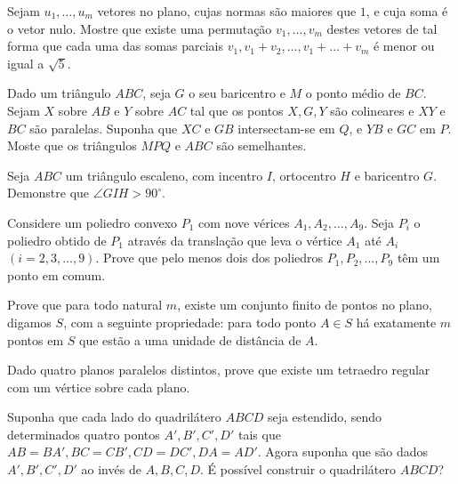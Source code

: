 \begin{questao}
  Sejam $u_1,\ldots,u_m$ vetores no plano, cujas normas
  são maiores que $1$, e cuja soma é o vetor nulo. Mostre que existe
  uma permutação $v_1,\ldots,v_m$ destes vetores de tal forma que
  cada uma das somas parciais $v_1, v_1+v_2,\ldots,v_1+\ldots+v_m$ é
  menor ou igual a $\sqrt{5}$.
\end{questao}

\begin{questao}
  Dado um triângulo $ABC$, seja $G$ o seu baricentro e
  $M$ o ponto médio de $BC$. Sejam $X$ sobre $AB$ e $Y$
  sobre $AC$ tal que os pontos $X,G,Y$ são colineares e $XY$ e
  $BC$ são paralelas. Suponha que $XC$ e $GB$ intersectam-se em
  $Q$, e $YB$ e $GC$ em $P$. Moste que os triângulos $MPQ$
  e $ABC$ são semelhantes.
\end{questao}

\begin{questao}
  Seja $ABC$ um triângulo escaleno, com incentro $I$,
  ortocentro $H$ e baricentro $G$. Demonstre que $\angle GIH >
  90^\circ$.
\end{questao}

\begin{questao}
  Considere um poliedro convexo $P_1$ com nove vérices
  $A_1,A_2,\ldots,A_9$. Seja $P_i$ o poliedro obtido de $P_1$
  através da translação que leva o vértice $A_1$ até $A_i$
  $(i=2,3,\ldots,9)$. Prove que pelo menos dois dos poliedros
  $P_1,P_2,\ldots,P_9$ têm um ponto em comum.
\end{questao}

\begin{questao}
  Prove que para todo natural $m$, existe um conjunto
  finito de pontos no plano, digamos $S$, com a seguinte
  propriedade: para todo ponto $A \in S$ há exatamente $m$ pontos
  em $S$ que estão a uma unidade de distância de $A$.
\end{questao}

\begin{questao}
  Dado quatro planos paralelos distintos, prove que existe
  um tetraedro regular com um vértice sobre cada plano.
\end{questao}

\begin{questao}
  Suponha que cada lado do quadrilátero $ABCD$ seja
  estendido, sendo determinados quatro pontos $A', B',
  C', D'$ tais que $AB=BA',BC=CB',
  CD=DC', DA = AD'$. Agora suponha que são dados
  $A', B', C', D'$ ao invés de
  $A,B,C,D$. É possível construir o quadrilátero $ABCD$?
\end{questao}

